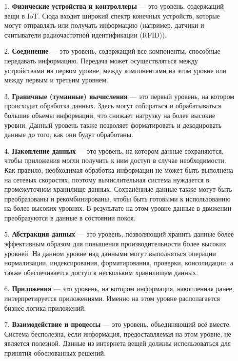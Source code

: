\begin{enumerate}
	\item[1.] \textbf{Физические устройства и контроллеры} --- это уровень, содержащий вещи в IoT. Сюда входит широкий спектр конечных устройств, которые могут отправлять или получать информацию (например, датчики и считыватели радиочастотной идентификации (RFID)).
	\item[2.] \textbf{Соединение} --- это уровень, содержащий все компоненты, способные передавать информацию. Передача может осуществляться между устройствами на первом уровне, между компонентами на этом уровне или между первым и третьим уровнем.
	\item[3.] \textbf{Граничные (туманные) вычисления} --- это первый уровень, на котором происходит обработка данных. Здесь могут собираться и обрабатываться большие объемы информации, что снижает нагрузку на более высокие уровни. Данный уровень также позволяет форматировать и декодировать данные до того, как они будут обработаны.
	\item[4.] \textbf{Накопление данных} --- это уровень, на котором данные сохраняются, чтобы приложения могли получить к ним доступ в случае необходимости. Как правило, необходимая обработка информации не может быть выполнена на сетевых скоростях, поэтому вычислительная система нуждается в промежуточном хранилище данных. Сохранённые данные также могут быть преобразованы и рекомбинированы, чтобы быть готовыми к использованию на более высоких уровнях. В результате на этом уровне данные в движении преобразуются в данные в состоянии покоя.
	\item[5.] \textbf{Абстракция данных} --- это уровень, позволяющий хранить данные более эффективным образом для повышения производительности более высоких уровней. На данном уровне над данными могут выполняться операции нормализации, индексирования, форматирования, проверки, консолидации, а также обеспечивается доступ к нескольким хранилищам данных.
	\item[6.] \textbf{Приложения} --- это уровень, на котором информация, накопленная ранее, интерпретируется приложениями. Именно на этом уровне располагается бизнес-логика приложений.
	\item[7.] \textbf{Взаимодействие и процессы} --- это уровень, объединяющий всё вместе. Система бесполезна, если информация, предоставляемая на этом уровне, не является полезной. Данные из интернета вещей должны использоваться для принятия обоснованных решений.
\end{enumerate}

